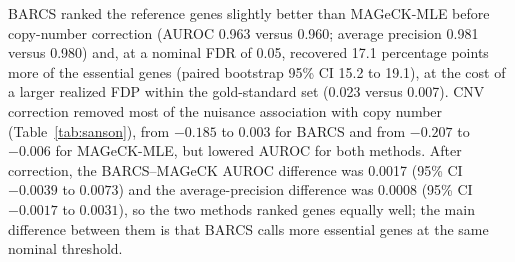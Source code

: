BARCS ranked the reference genes slightly better than MAGeCK-MLE before copy-number
correction (AUROC 0.963 versus 0.960; average precision 0.981 versus 0.980)
and, at a nominal FDR of 0.05, recovered 17.1 percentage points more of the
essential genes (paired bootstrap 95\% CI 15.2 to 19.1), at the cost of a
larger realized FDP within the gold-standard set (0.023 versus 0.007).
CNV correction removed most of the nuisance association with copy number
(Table~\ref{tab:sanson}), from $-0.185$ to $0.003$ for BARCS and from $-0.207$
to $-0.006$ for MAGeCK-MLE, but lowered AUROC for both methods.  After
correction, the BARCS--MAGeCK AUROC difference was 0.0017 (95\% CI $-0.0039$
to $0.0073$) and the average-precision difference was 0.0008 (95\% CI
$-0.0017$ to $0.0031$), so the two methods ranked genes equally well; the
main difference between them is that BARCS calls more essential genes at the
same nominal threshold.
